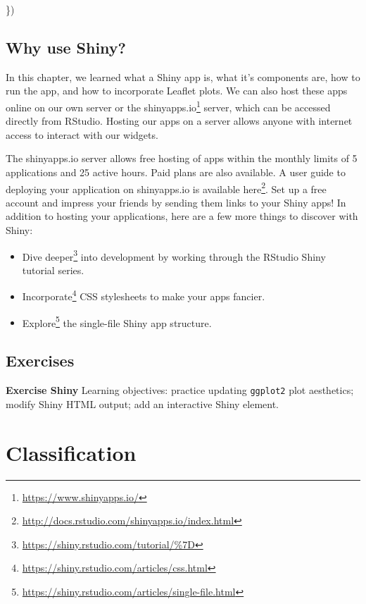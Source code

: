 \documentclass[
]{krantz}
\newenvironment{Shaded}{\begin{snugshade}}{\end{snugshade}}
\newcommand{\NormalTok}[1]{#1}
\providecommand{\tightlist}{%
  \setlength{\itemsep}{0pt}\setlength{\parskip}{0pt}}
\renewcommand{\href}[2]{#2\footnote{\url{#1}}}
\begin{document}
\begin{Shaded}
\begin{Highlighting}[]
\NormalTok{  \})}
\end{Highlighting}
\end{Shaded}

\hypertarget{why-use-shiny}{%
\section{Why use Shiny?}\label{why-use-shiny}}

In this chapter, we learned what a Shiny app is, what it's components are, how to run the app, and how to incorporate Leaflet plots. We can also host these apps online on our own server or the \href{https://www.shinyapps.io/}{shinyapps.io} server, which can be accessed directly from RStudio. Hosting our apps on a server allows anyone with internet access to interact with our widgets.

The shinyapps.io server allows free hosting of apps within the monthly limits of 5 applications and 25 active hours. Paid plans are also available. A user guide to deploying your application on shinyapps.io is available \href{http://docs.rstudio.com/shinyapps.io/index.html}{here}. Set up a free account and impress your friends by sending them links to your Shiny apps! In addition to hosting your applications, here are a few more things to discover with Shiny:

\begin{itemize}
\tightlist
\item
  \href{https://shiny.rstudio.com/tutorial/\%7D}{Dive deeper} into development by working through the RStudio Shiny tutorial series.
\item
  \href{https://shiny.rstudio.com/articles/css.html}{Incorporate} CSS stylesheets to make your apps fancier.
\item
  \href{https://shiny.rstudio.com/articles/single-file.html}{Explore} the single-file Shiny app structure.
\end{itemize}

\hypertarget{shinyEx}{%
\section{Exercises}\label{shinyEx}}

\textbf{Exercise Shiny} Learning objectives: practice updating \texttt{ggplot2} plot aesthetics; modify Shiny HTML output; add an interactive Shiny element.

\hypertarget{classification}{%
\chapter{Classification}\label{classification}}
\end{document}
